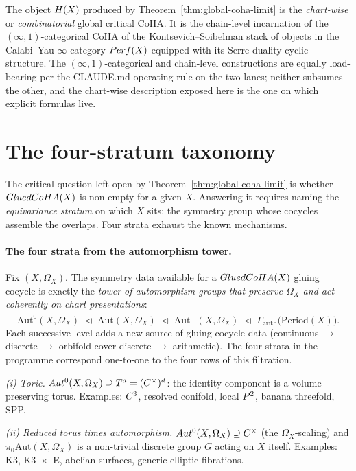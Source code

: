 \begin{remark}
\label{rem:cat-viewpoint-coha}
The object $H(X)$ produced by
Theorem~\ref{thm:global-coha-limit} is the \emph{chart-wise} or
\emph{combinatorial} global critical CoHA. It is the chain-level
incarnation of the $(\infty, 1)$-categorical CoHA of the
Kontsevich--Soibelman stack of objects in the Calabi--Yau
$\infty$-category $Perf(X)$ equipped with its Serre-duality
cyclic structure. The $(\infty, 1)$-categorical and chain-level
constructions are equally load-bearing per the CLAUDE.md
operating rule on the two lanes; neither subsumes the other, and
the chart-wise description exposed here is the one on which
explicit formulas live.
\end{remark}

\section{The four-stratum taxonomy}
\label{sec:four-stratum-taxonomy}

The critical question left open by
Theorem~\ref{thm:global-coha-limit} is whether $GluedCoHA(X)$ is
non-empty for a given $X$. Answering it requires naming the
\emph{equivariance stratum} on which $X$ sits: the symmetry group
whose cocycles assemble the overlaps. Four strata exhaust the
known mechanisms.

\paragraph{The four strata from the automorphism tower.} Fix
$(X, \Omega_X)$. The symmetry data available for a $GluedCoHA(X)$
gluing cocycle is exactly the \emph{tower of automorphism groups
that preserve $\Omega_X$ and act coherently on chart presentations}:
\[
  \mathrm{Aut}^{0}(X, \Omega_X)
  \;\lhd\;
  \mathrm{Aut}(X, \Omega_X)
  \;\lhd\;
  \mathrm{Aut}^{\widetilde{\phantom{X}}}(X, \Omega_X)
  \;\lhd\;
  \Gamma_{\mathrm{arith}}\bigl(\mathrm{Period}(X)\bigr).
\]
Each successive level adds a new source of gluing cocycle data
(continuous $\to$ discrete $\to$ orbifold-cover discrete $\to$
arithmetic). The four strata in the programme correspond one-to-one
to the four rows of this filtration.

\emph{(i) Toric.} $Aut^0(X, \Omega_X) \supseteq T^d =
(C^\times)^d$: the identity component is a
volume-preserving torus. Examples: $C^3$, resolved conifold,
local $P^2$, banana threefold, SPP.

\emph{(ii) Reduced torus times automorphism.} $Aut^0(X,
\Omega_X) \supseteq C^\times$ (the $\Omega_X$-scaling) and
$\pi_0 \mathrm{Aut}(X, \Omega_X)$ is a non-trivial discrete group
$G$ acting on $X$ itself. Examples: K3, K3~$\times$~E, abelian
surfaces, generic elliptic fibrations.

